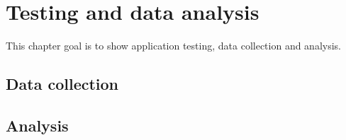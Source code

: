 \chapter{Testing and data analysis}\label{sec:TestingAndDataAnalysis}
This chapter goal is to show application testing, data collection and analysis.

\section{Data collection}
\label{sec:DataCollection}

\section{Analysis}
\label{sec:Analysis}